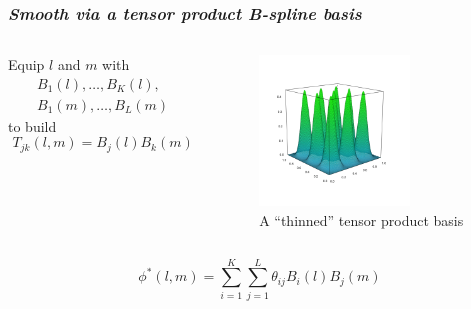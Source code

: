 \documentclass[12pt]{beamer}
\newcommand{\carrotorangemath}[1]{{ \color{carrotorange} {#1}}}
\begin{document}
%
%

\begin{frame}
\frametitle{\emph{Smooth via a tensor product B-spline basis}}

 \begin{columns}
\begin{column}{0.5\textwidth}
Equip $l$ and $m$ with
\begin{align*}
B_{1}\left(l\right),\dots, B_{K}\left(l\right),\\
B_{1}\left(m\right),\dots, B_{L}\left(m\right)
\end{align*}
to build
\begin{equation*}
T_{jk}\left(l,m\right) = B_j\left(l\right){B}_k\left(m\right)
\end{equation*}
  \end{column}
\begin{column}{0.5\textwidth}  %
    \begin{center}
    \begin{figure}
    \graphicspath{{img/}}
 \includegraphics[width=4cm]{sparse_bicubic_basis}
 \caption{A ``thinned'' tensor product basis}
 \end{figure}
     \end{center}
\end{column}
\end{columns}
\vspace{0.3cm}
\begin{equation*}
\phi^*\left(l,m\right) = \sum_{i=1}^K \sum_{j=1}^L \theta_{ij} B_{i}\left(l\right) B_{j}\left(m\right)
\end{equation*}

\end{frame}
\end{document}
